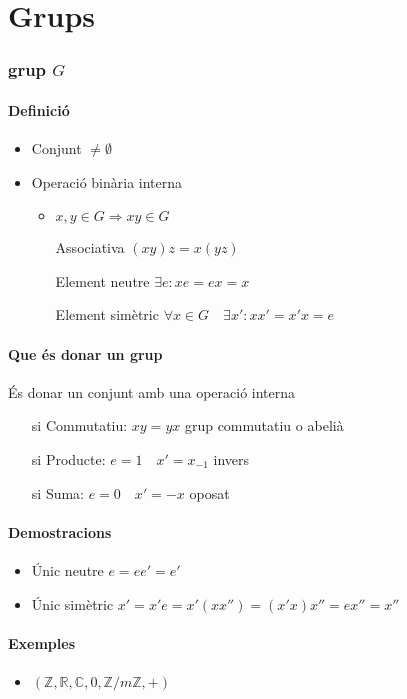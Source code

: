 \documentclass[a4paper,10pt]{article}
\newcommand{\red}[1]{{\color{red}#1}}
\newcommand{\Z}{\mathbb{Z}}
\newcommand{\R}{\mathbb{R}}
\newcommand{\C}{\mathbb{C}}
\begin{document}
\tableofcontents\newpage
\part{\red{G}rups}
\section{grup $G$}
\subsection*{Definició}
\begin{itemize}
\item Conjunt $\neq \emptyset$
\item Operació binària interna
	\begin{itemize}
	\item $x, y \in G \Rightarrow xy \in G$
	\item[Associativa] $(xy)z = x(yz)$
	\item[Element neutre] $\exists e: xe = ex = x$
	\item[Element simètric] $\forall x \in G \quad \exists x': xx' = x'x = e$
	\end{itemize}
\end{itemize}
\subsection*{Que és donar un grup}
És donar un conjunt amb una operació interna
\begin{itemize}
\item[si] Commutatiu: $xy = yx$ \red{grup commutatiu} o \red{abelià}
\item[si] Producte: $e = 1\quad x' = x_{-1}$ \red{invers}
\item[si] Suma: $e = 0\quad x' = -x$ \red{oposat}
\end{itemize}
\subsection*{Demostracions}
\begin{itemize}
\item Únic neutre
	\subitem $e = ee' = e'$
\item Únic simètric
	\subitem $x' = x'e = x'(xx'') = (x'x)x'' = ex'' = x''$
\end{itemize}
\subsection*{Exemples}
\begin{itemize}
\item $(\Z, \R, \C, {0}, \Z/m\Z, +)$
\end{itemize}
\end{document}
